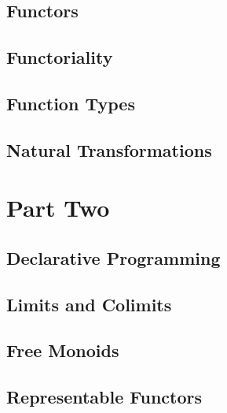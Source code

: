 \chapter{Functors}\label{functors}


\chapter{Functoriality}\label{functoriality}


\chapter{Function Types}\label{function-types}


\chapter{Natural Transformations}\label{natural-transformations}


\part*{Part Two}

\chapter{Declarative Programming}\label{declarative-programming}


\chapter{Limits and Colimits}\label{limits-and-colimits}


\chapter{Free Monoids}\label{free-monoids}


\chapter{Representable Functors}\label{representable-functors}


